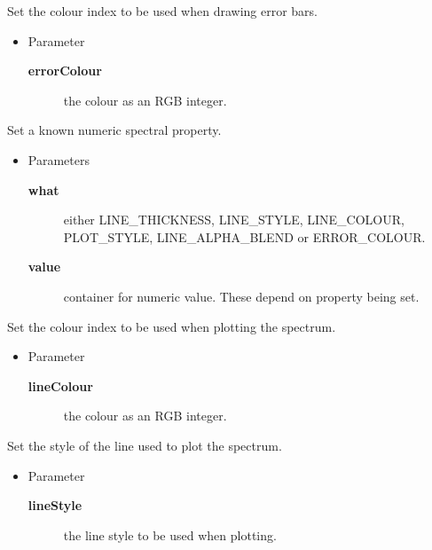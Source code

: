 \begin{desc}Set the colour index to be used when drawing error bars.
\begin{itemize}
\item{Parameter
  \begin{description}
   \item[\textbf{errorColour}]{the colour as an RGB integer.}
  \end{description}}
\end{itemize}
\end{desc}

\begin{desc}Set a known numeric spectral property.
\begin{itemize}
\item{Parameters
  \begin{description}
   \item[\textbf{what}]{either LINE\_THICKNESS, LINE\_STYLE, LINE\_COLOUR,
             PLOT\_STYLE, LINE\_ALPHA\_BLEND or ERROR\_COLOUR.}
   \item[\textbf{value}]{container for numeric value. These depend on
              property being set.}
  \end{description}}
\end{itemize}
\end{desc}

\begin{desc}Set the colour index to be used when plotting the spectrum.
\begin{itemize}
\item{Parameter
  \begin{description}
   \item[\textbf{lineColour}]{the colour as an RGB integer.}
  \end{description}}
\end{itemize}
\end{desc}

\begin{desc}Set the style of the line used to plot the spectrum.
\begin{itemize}
\item{Parameter
  \begin{description}
   \item[\textbf{lineStyle}]{the line style to be used when plotting.}
  \end{description}}
\end{itemize}
\end{desc}


